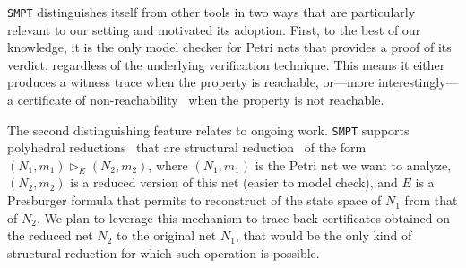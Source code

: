 \texttt{SMPT} distinguishes itself from other tools in two ways that are particularly relevant to our setting and motivated its adoption. First, to the best of our knowledge, it is the only model checker for Petri nets that provides a proof of its verdict, regardless of the underlying verification technique. This means it either produces a witness trace when the property is reachable, or—more interestingly—a certificate of non-reachability~\cite{AmDaHu22} when the property is not reachable.

The second distinguishing feature relates to ongoing work. \texttt{SMPT} supports polyhedral reductions~\cite{AmBeDa21} that are structural reduction~\cite{Be87,BeLeDa20} of the form $(N_1, m_1) \vartriangleright_E (N_2, m_2)$, where $(N_1, m_1)$ is the Petri net we want to analyze, $(N_2, m_2)$ is a reduced version of this net (easier to model check), and $E$ is a Presburger formula that permits to reconstruct of the state space of $N_1$ from that of $N_2$. We plan to leverage this mechanism to trace back certificates obtained on the reduced net $N_2$ to the original net $N_1$, that would be the only kind of structural reduction for which such operation is possible.

%
%

